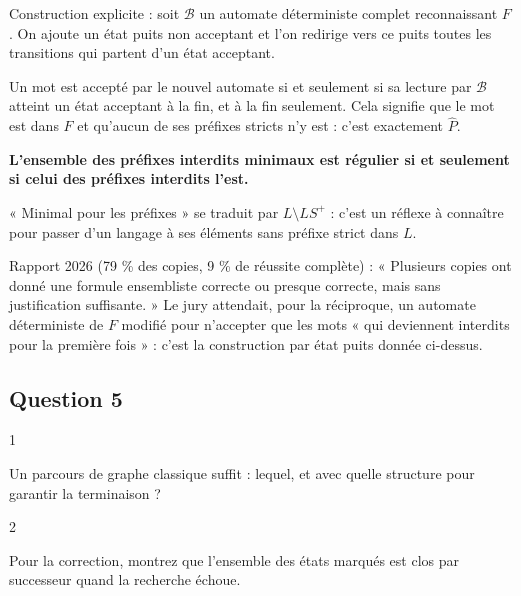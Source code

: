 \documentclass[11pt,a4paper]{article}
\begin{document}
Construction explicite : soit \(\mathcal B\) un automate déterministe complet reconnaissant \(F\). On ajoute un état puits non acceptant et l'on redirige vers ce puits toutes les transitions qui partent d'un état acceptant.

Un mot est accepté par le nouvel automate si et seulement si sa lecture par \(\mathcal B\) atteint un état acceptant à la fin, et à la fin seulement. Cela signifie que le mot est dans \(F\) et qu'aucun de ses préfixes stricts n'y est : c'est exactement \(\hat P\).

\textbf{L'ensemble des préfixes interdits minimaux est régulier si et seulement si celui des préfixes interdits l'est.}

\begin{methode}

« Minimal pour les préfixes » se traduit par \(L\setminus LS^+\) : c'est un réflexe à connaître pour passer d'un langage à ses éléments sans préfixe strict dans \(L\).

\end{methode}

\begin{jury}

Rapport 2026 (79 \% des copies, 9 \% de réussite complète) : « Plusieurs copies ont donné une formule ensembliste correcte ou presque correcte, mais sans justification suffisante. » Le jury attendait, pour la réciproque, un automate déterministe de \(F\) modifié pour n'accepter que les mots « qui deviennent interdits pour la première fois » : c'est la construction par état puits donnée ci-dessus.

\end{jury}

\hypertarget{question-5}{%
\subsection{Question 5}\label{question-5}}

\begin{indication}{1}

Un parcours de graphe classique suffit : lequel, et avec quelle structure pour garantir la terminaison ?

\end{indication}

\begin{indication}{2}

Pour la correction, montrez que l'ensemble des états marqués est clos par successeur quand la recherche échoue.

\end{indication}
\end{document}
